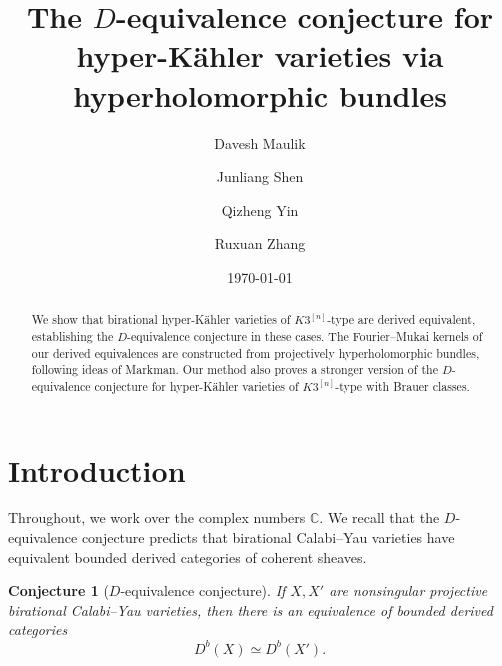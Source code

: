 \documentclass[11pt]{amsart}
\theoremstyle{plain}
\newtheorem{conj}[thm]{Conjecture}
\theoremstyle{definition}
\theoremstyle{remark}
\newcommand{\BC}{{\mathbb{C}}}
\begin{document}
\title[The $D$-equivalence conjecture]{The $D$-equivalence conjecture for hyper-K\"ahler varieties via hyperholomorphic bundles}
\date{\today}


\author[D. Maulik]{Davesh Maulik}
\address{Massachusetts Institute of Technology}

\author[J. Shen]{Junliang Shen}
\address{Yale University}

\author[Q. Yin]{Qizheng Yin}
\address{Peking University}

\author[R. Zhang]{Ruxuan Zhang}
\address{Fudan University}


\begin{abstract}
We show that birational hyper-K\"ahler varieties of $K3^{[n]}$-type are derived equivalent, establishing the $D$-equivalence conjecture in these cases. The Fourier--Mukai kernels of our derived equivalences are constructed from projectively hyperholomorphic bundles, following ideas of Markman. Our method also proves a stronger version of the $D$-equivalence conjecture for hyper-K\"ahler varieties of $K3^{[n]}$-type with Brauer classes.
\end{abstract}

\maketitle

\setcounter{tocdepth}{1} 

\tableofcontents
\setcounter{section}{-1}

\section{Introduction}

Throughout, we work over the complex numbers $\BC$. We recall that the $D$-equivalence conjecture \cite{BO, K} predicts that birational Calabi--Yau varieties have equivalent bounded derived categories of coherent sheaves.

\begin{conj}[$D$-equivalence conjecture]\label{conj}
If $X, X'$ are nonsingular projective birational Calabi--Yau varieties, then there is an equivalence of bounded derived categories
\[
D^b(X) \simeq D^b(X').
\]
\end{conj}

\end{document}
